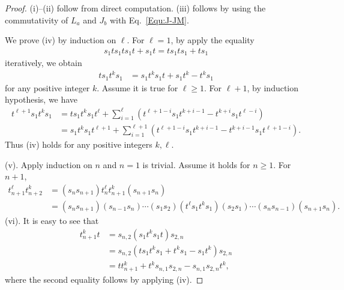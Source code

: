 \documentclass[a4paper, oneside]{amsart}
\numberwithin{equation}{section}
\theoremstyle{definition}
\theoremstyle{remark}
\begin{document}
\begin{proof} (i)--(ii) follow from direct computation. (iii) follows by using the commutativity of $L_a$ and $J_b$ with Eq.~\eqref{Equ:J-JM}.

We prove (iv) by induction on $\ell$. For $\ell=1$, by apply the equality \begin{align*}s_1ts_1ts_1t+s_1t=ts_1ts_1+ts_1\end{align*} iteratively, we obtain
\begin{align*}
ts_1t^{k}s_1&=s_1t^{k}s_1t+s_1t^{k}-t^{k}s_1
\end{align*}
for any positive integer $k$. Assume it is true for $\ell\geq 1$. For $\ell+1$, by induction hypothesis, we  have
\begin{align*}
t^{\ell+1}s_1t^{k}s_1&=ts_1t^{k}s_1t^{\ell}+\sum_{i=1}^{\ell}\left(t^{\ell+1-i}
s_1t^{k+i-1}-t^{k+i}s_1t^{\ell-i}\right)\\
&=s_1t^{k}s_1t^{\ell+1}+\sum_{i=1}^{\ell+1}\left(t^{\ell+1-i}
s_1t^{k+i-1}-t^{k+i-1}s_1t^{\ell+1-i}\right).
 \end{align*}
Thus (iv) holds for any positive integers $k,\ell$.

 (v). Apply induction on $n$ and $n=1$ is trivial. Assume it holds for $n\geq 1$. For $n+1$, \begin{align*}
 t_{n+1}^{\ell}t_{n+2}^{k}&=(s_ns_{n+1})t_{n}^{\ell}t_{n+1}^{k}(s_{n+1}s_{n})\\
  &=(s_ns_{n+1})(s_{n-1}s_n)\cdots(s_1s_2)(t^{\ell}s_1t^{k}s_1)
    (s_2s_1)\cdots(s_ns_{n-1})(s_{n+1}s_{n}).
 \end{align*}
 (vi). It is easy to see that
 \begin{align*}
   t_{n+1}^kt&=s_{n,2}(s_1t^ks_1t)s_{2,n}\\
   &=s_{n,2}(ts_1t^ks_1+t^ks_1-s_1t^k)s_{2,n}\\
   &=tt_{n+1}^k+t^ks_{n,1}s_{2,n}-s_{n,1}s_{2,n}t^k,
 \end{align*}
where the second equality follows by applying (iv).
\end{proof}
\end{document}

